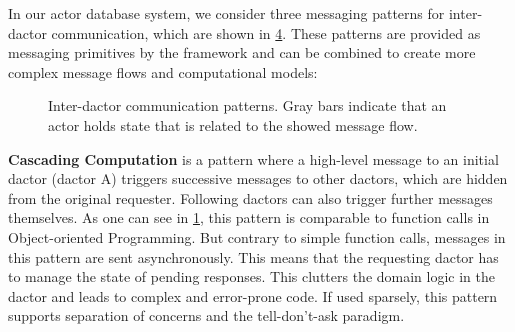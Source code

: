     In our actor database system, we consider three messaging patterns for inter-\gls{dactor} communication, which are shown in \cref{fig:comp_patterns}.
    These patterns are provided as messaging primitives by the framework and can be combined to create more complex message flows and computational models:

    \begin{figure}
      \centering
      \begin{subfigure}[t]{0.32\textwidth}
        \centering
        
        \label{fig:comp_pattern_1}
      \end{subfigure}\hfill
      \begin{subfigure}[t]{0.32\textwidth}
        \centering
        
        \label{fig:comp_pattern_2}
      \end{subfigure}\hfill
      \begin{subfigure}[t]{0.32\textwidth}
        \centering
        
        \label{fig:comp_pattern_3}
      \end{subfigure}
      \caption{Inter-\gls{dactor} communication patterns. Gray bars indicate that an actor holds state that is related to the showed message flow.}
      \label{fig:comp_patterns}
    \end{figure}

      \textbf{Cascading Computation} is a pattern where a high-level message to an initial \gls{dactor} (\gls{dactor} A) triggers successive messages to other \glspl{dactor}, which are hidden from the original requester.
      Following \glspl{dactor} can also trigger further messages themselves.
      As one can see in \cref{fig:comp_pattern_1}, this pattern is comparable to function calls in Object-oriented Programming.
      But contrary to simple function calls, messages in this pattern are sent asynchronously.
      This means that the requesting \gls{dactor} has to manage the state of pending responses.
      This clutters the domain logic in the \gls{dactor} and leads to complex and error-prone code.
      If used sparsely, this pattern supports separation of concerns and the tell-don't-ask paradigm.

